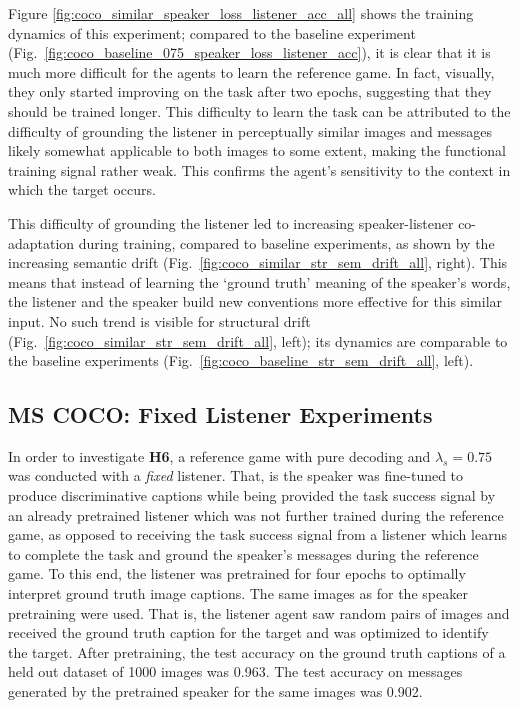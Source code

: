 Figure \ref{fig:coco_similar_speaker_loss_listener_acc_all} shows the training dynamics of this experiment; compared to the baseline experiment (Fig.~\ref{fig:coco_baseline_075_speaker_loss_listener_acc}), it is clear that it is much more difficult for the agents to learn the reference game. In fact, visually, they only started improving on the task after two epochs, suggesting that they should be trained longer. This difficulty to learn the task can be attributed to the difficulty of grounding the listener in perceptually similar images and messages likely somewhat applicable to both images to some extent, making the functional training signal rather weak.  This confirms the agent's sensitivity to the context in which the target occurs. 

This difficulty of grounding the listener led to increasing speaker-listener co-adaptation during training, compared to baseline experiments, as shown by the increasing semantic drift (Fig.~\ref{fig:coco_similar_str_sem_drift_all}, right). This means that instead of learning the `ground truth' meaning of the speaker's words, the listener and the speaker build new conventions more effective for this similar input. No such trend is visible for structural drift (Fig.~\ref{fig:coco_similar_str_sem_drift_all}, left); its dynamics are comparable to the baseline experiments (Fig.~\ref{fig:coco_baseline_str_sem_drift_all}, left). 


\subsection{MS COCO: Fixed Listener Experiments}
\label{exp:coco_fixed_listener}
In order to investigate \textbf{H6}, a reference game with pure decoding and $\lambda_s=0.75$ was conducted with a \emph{fixed} listener. That, is the speaker was fine-tuned to produce discriminative captions while being provided the task success signal by an already pretrained listener which was not further trained during the reference game, as opposed to receiving the task success signal from a listener which learns to complete the task and ground the speaker's messages during the reference game. To this end, the listener was pretrained for four epochs to optimally interpret ground truth image captions. The same images as for the speaker pretraining were used. That is, the listener agent saw random pairs of images and received the ground truth caption for the target and was optimized to identify the target. After pretraining, the test accuracy on the ground truth captions of a held out dataset of 1000 images was 0.963. The test accuracy on messages generated by the pretrained speaker for the same images was 0.902.

